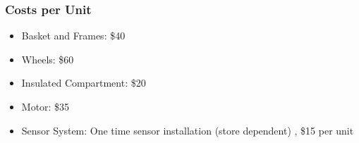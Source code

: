 \documentclass[12pt]{beamer}
\begin{document}
\begin{frame}


  \frametitle{Costs per Unit }
 \vspace{-3.0cm}
	\begin{itemize}
	
      \item Basket and Frames: \$40
      \item Wheels: \$60
      \item Insulated Compartment:  \$20
      \item Motor: \$35
      \item Sensor System: One time sensor installation (store dependent) , \$15 per unit
    \end{itemize}
\end{frame}
\end{document}
